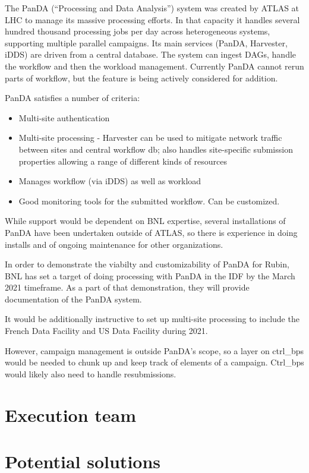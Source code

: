 The PanDA (``Processing and Data Analysis'') system was created by
ATLAS at LHC to manage its massive processing efforts. In that
capacity it handles several hundred thousand processing jobs per day
across heterogeneous systems, supporting multiple parallel
campaigns. Its main services (PanDA, Harvester, iDDS) are driven from
a central database. The system can ingest DAGs, handle the workflow
and then the workload management. Currently PanDA cannot rerun parts
of workflow, but the feature is being actively considered for addition.

PanDA satisfies a number of criteria:
\begin{itemize}
\item Multi-site authentication
\item Multi-site processing - Harvester can be used to mitigate network traffic between sites and central workflow db; also handles site-specific submission properties allowing a range of different kinds of resources
\item Manages workflow (via iDDS) as well as workload
\item Good monitoring tools for the submitted workflow. Can be customized.
\end{itemize}

While support would be dependent on BNL expertise, several
installations of PanDA have been undertaken outside of ATLAS, so there
is experience in doing installs and of ongoing maintenance for other
organizations.

In order to demonstrate the viabilty and customizability of PanDA for
Rubin, BNL has set a target of doing processing with PanDA in the IDF
by the March 2021 timeframe. As a part of that demonstration, they
will provide documentation of the PanDA system.

It would be additionally instructive to set up multi-site processing
to include the French Data Facility and US Data Facility during 2021.

However, campaign management is outside PanDA’s scope, so a layer on ctrl\_bps would be needed to chunk up and keep track of elements of a campaign. Ctrl\_bps would likely also need to handle resubmissions.


\section {Execution team }


\section {Potential solutions} \label{sec:potential}

